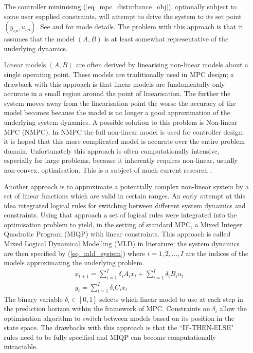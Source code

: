 The controller minimising (\ref{eq_mpc_disturbance_obj}), optionally subject to some user supplied constraints, will attempt to drive the system to its set point $(y_{sp}, u_{sp})$. See \cite{raw} and \cite{maeder} for mode details. The problem with this approach is that it assumes that the model $(A, B)$ is at least somewhat representative of the underlying dynamics.

Linear models $(A, B)$ are often derived by linearising non-linear models about a single operating point. These models are traditionally used in MPC design; a drawback with this approach is that linear models are fundamentally only accurate in a small region around the point of linearisation. The further the system moves away from the linearisation point the worse the accuracy of the model becomes because the model is no longer a good approximation of the underlying system dynamics. A possible solution to this problem is Non-linear MPC (NMPC). In NMPC the full non-linear model is used for controller design; it is hoped that this more complicated model is accurate over the entire problem domain. Unfortunately this approach is often computationally intensive, especially for large problems, because it inherently requires non-linear, usually non-convex, optimisation. This is a subject of much current research \cite{diehl}. 

Another approach is to approximate a potentially complex non-linear system by a set of linear functions which are valid in certain ranges. An early attempt at this idea \cite{bemporad} integrated logical rules for switching between different system dynamics and constraints. Using that approach a set of logical rules were integrated into the optimisation problem to yield, in the setting of standard MPC, a Mixed Integer Quadratic Program (MIQP) with linear constraints. This approach is called Mixed Logical Dynamical Modelling (MLD) in literature; the system dynamics are then specified by (\ref{eq_mld_system}) where $i=1,2,..., I$ are the indices of the models approximating the underlying problem.
\begin{equation}
\begin{aligned}
&x_{t+1} = \sum_{i=1}^I \delta_i A_i x_t + \sum_{i=1}^I \delta_i B_i u_t \\
&y_t = \sum_{i=1}^I \delta_i C_i x_t 
\end{aligned}
\label{eq_mld_system}
\end{equation}
The binary variable $\delta_i \in [0, 1]$ selects which linear model to use at each step in the prediction horizon within the framework of MPC. Constraints on $\delta_i$ allow the optimisation algorithm to switch between models based on its position in the state space.  The drawbacks with this approach is that the ``IF-THEN-ELSE" rules need to be fully specified and MIQP can become computationally intractable. 

